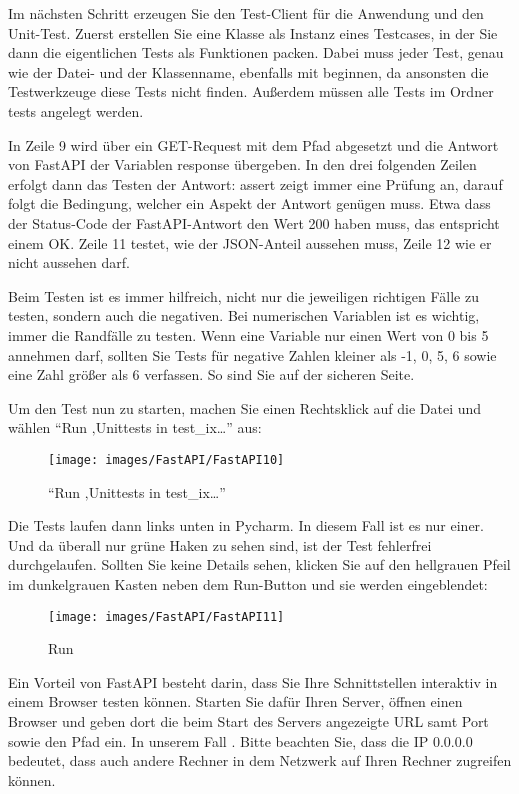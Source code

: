 Im nächsten Schritt erzeugen Sie den Test-Client für die Anwendung und den Unit-Test. Zuerst erstellen Sie eine Klasse als Instanz eines Testcases, in der Sie dann die eigentlichen Tests als Funktionen packen. Dabei muss jeder Test, genau wie der Datei- und der Klassenname, ebenfalls mit  beginnen, da ansonsten die Testwerkzeuge diese Tests nicht finden. Außerdem müssen alle Tests im Ordner tests angelegt werden.

In Zeile 9 wird über  ein GET-Request mit dem Pfad  abgesetzt und die Antwort von FastAPI der Variablen response übergeben. In den drei folgenden Zeilen erfolgt dann das Testen der Antwort: assert zeigt immer eine Prüfung an, darauf folgt die Bedingung, welcher ein Aspekt der Antwort genügen muss. Etwa dass der Status-Code der FastAPI-Antwort den Wert 200 haben muss, das entspricht einem OK. Zeile 11 testet, wie der JSON-Anteil aussehen muss, Zeile 12 wie er nicht aussehen darf.

Beim Testen ist es immer hilfreich, nicht nur die jeweiligen richtigen Fälle zu testen, sondern auch die negativen. Bei numerischen Variablen ist es wichtig, immer die Randfälle zu testen. Wenn eine Variable nur einen Wert von 0 bis 5 annehmen darf, sollten Sie Tests für negative Zahlen kleiner als -1, 0, 5, 6 sowie eine Zahl größer als 6 verfassen. So sind Sie auf der sicheren Seite.

Um den Test nun zu starten, machen Sie einen Rechtsklick auf die Datei und wählen ``Run ‚Unittests in test\_ix\ldots'' aus:

\begin{figure}
    \texttt{[image: images/FastAPI/FastAPI10]}
    \caption{``Run ‚Unittests in test\_ix\ldots''} \label{FastAPI10}
\end{figure}


Die Tests laufen dann links unten in Pycharm. In diesem Fall ist es nur einer. Und da überall nur grüne Haken zu sehen sind, ist der Test fehlerfrei durchgelaufen. Sollten Sie keine Details sehen, klicken Sie auf den hellgrauen Pfeil im dunkelgrauen Kasten neben dem Run-Button und sie werden eingeblendet:

\begin{figure}
  \texttt{[image: images/FastAPI/FastAPI11]}
  \caption{Run} \label{FastAPI11}
\end{figure}


Ein Vorteil von FastAPI besteht darin, dass Sie Ihre Schnittstellen interaktiv in einem Browser testen können. Starten Sie dafür Ihren Server, öffnen einen Browser und geben dort die beim Start des Servers angezeigte URL samt Port sowie den Pfad  ein. In unserem Fall . Bitte beachten Sie, dass die IP 0.0.0.0 bedeutet, dass auch andere Rechner in dem Netzwerk auf Ihren Rechner zugreifen können.

